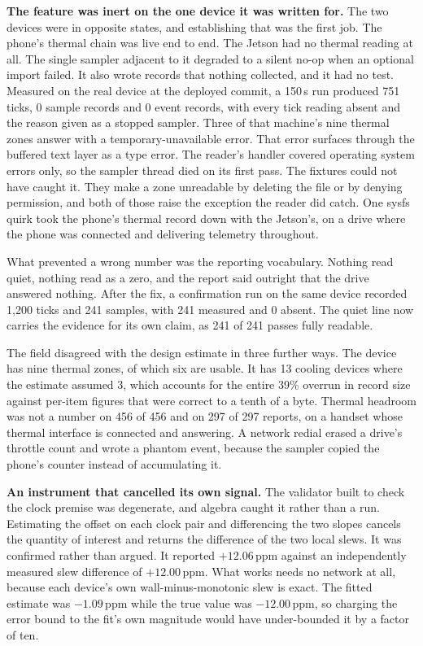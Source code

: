 \noindent\textbf{The feature was inert on the one device it was written for.}
The two devices were in opposite states, and establishing that was the first
job. The phone's thermal chain was live end to end. The Jetson had no thermal
reading at all. The single sampler adjacent to it degraded to a silent no-op
when an optional import failed. It also wrote records that nothing collected,
and it had no test. Measured on the real device at the deployed commit, a 150\,s run produced
751 ticks, 0 sample records and 0 event records, with every tick reading absent
and the reason given as a stopped sampler. Three of that machine's nine thermal
zones answer with a temporary-unavailable error. That error surfaces through the
buffered text layer as a type error. The reader's handler covered operating
system errors only, so the sampler thread died on its first pass. The
fixtures could not have caught it. They make a zone unreadable by deleting the
file or by denying permission, and both of those raise the exception the reader
did catch. One sysfs quirk took the phone's thermal record down with the
Jetson's, on a drive where the phone was connected and delivering telemetry
throughout.

What prevented a wrong number was the reporting vocabulary. Nothing read quiet,
nothing read as a zero, and the report said outright that the drive answered
nothing. After the fix, a confirmation run on the same device recorded 1{,}200 ticks
and 241 samples, with 241 measured and 0 absent. The quiet line now carries the
evidence for its own claim, as 241 of 241 passes fully readable.

The field disagreed with the design estimate in three further ways. The device
has nine thermal zones, of which six are usable. It has 13 cooling devices where
the estimate assumed 3, which accounts for the entire 39\% overrun in record
size against per-item figures that were correct to a tenth of a byte. Thermal
headroom was not a number on 456 of 456 and on 297 of 297 reports, on a handset
whose thermal interface is connected and answering. A network redial erased a
drive's throttle count and wrote a phantom event, because the sampler copied the
phone's counter instead of accumulating it.

\noindent\textbf{An instrument that cancelled its own signal.}
The validator built to check the clock premise was degenerate, and algebra
caught it rather than a run. Estimating the offset on each clock pair and
differencing the two slopes cancels the quantity of interest and returns the
difference of the two local slews. It was confirmed rather than argued. It
reported $+12.06$\,ppm against an independently measured slew difference of
$+12.00$\,ppm. What works needs no network at all, because each device's own
wall-minus-monotonic slew is exact. The fitted estimate was $-1.09$\,ppm while
the true value was $-12.00$\,ppm, so charging the error bound to the fit's own
magnitude would have under-bounded it by a factor of ten.

